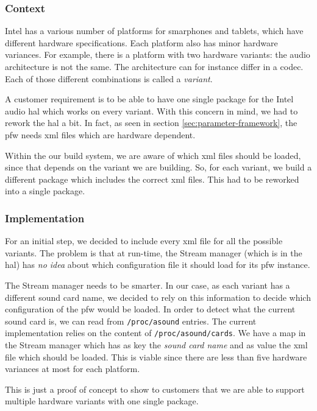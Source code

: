 \subsubsection{Context}
Intel has a various number of platforms for smarphones and tablets, which have different hardware specifications.
Each platform also has minor hardware variances.
For example, there is a platform with two hardware variants: the audio architecture is not the same.
The architecture can for instance differ in a codec. Each of those different combinations is called a \emph{variant}.

A customer requirement is to be able to have one single package for the Intel audio \gls{hal} which works on every variant.
With this concern in mind, we had to rework the \gls{hal} a bit.
In fact, as seen in section \ref{sec:parameter-framework}, the \gls{pfw} needs \gls{xml} files which are hardware dependent.

Within the our build system, we are aware of which \gls{xml} files should be loaded, since that depends on the variant we are building.
So, for each variant, we build a different package which includes the correct \gls{xml} files.
This had to be reworked into a single package.

\subsubsection{Implementation}
For an initial step, we decided to include every \gls{xml} file for all the possible variants.
The problem is that at run-time, the Stream manager (which is in the \gls{hal}) has \emph{no idea} about which configuration file
it should load for its \gls{pfw} instance.

The Stream manager needs to be smarter. In our case, as each variant has a different sound card name, we decided to
rely on this information to decide which configuration of the \gls{pfw} would be loaded.
In order to detect what the current sound card is, we can read from \lstinline{/proc/asound} entries.
The current implementation relies on the content of \lstinline{/proc/asound/cards}.
We have a map in the Stream manager which has as key the \emph{sound card name} and as value the \gls{xml} file which should be loaded.
This is viable since there are less than five hardware variances at most for each platform.

This is just a proof of concept to show to customers that we are able to support multiple hardware variants with one single package.


